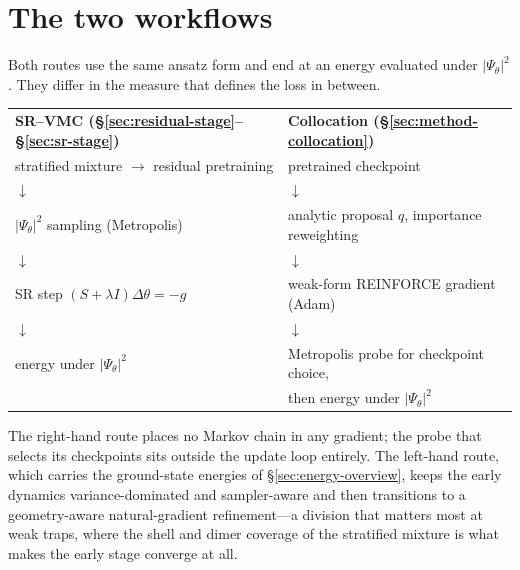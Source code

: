 \section{The two workflows}
\label{sec:opt-summary}

Both routes use the same ansatz form and end at an energy evaluated under
$|\Psi_\theta|^2$. They differ in the measure that defines the loss in between.
\begin{center}\small
\begin{tabular}{@{}ll@{}}
\textbf{SR--VMC (\S\ref{sec:residual-stage}--\S\ref{sec:sr-stage})} &
\textbf{Collocation (\S\ref{sec:method-collocation})}\\[2pt]
stratified mixture $\to$ residual pretraining &
pretrained checkpoint\\
$\downarrow$ & $\downarrow$\\
$|\Psi_\theta|^2$ sampling (Metropolis) &
analytic proposal $q$, importance reweighting\\
$\downarrow$ & $\downarrow$\\
SR step $(S+\lambda I)\Delta\theta=-g$ &
weak-form REINFORCE gradient (Adam)\\
$\downarrow$ & $\downarrow$\\
energy under $|\Psi_\theta|^2$ &
Metropolis probe for checkpoint choice,\\
 & then energy under $|\Psi_\theta|^2$\\
\end{tabular}
\end{center}
The right-hand route places no Markov chain in any gradient; the probe that selects its
checkpoints sits outside the update loop entirely. The left-hand route, which carries the
ground-state energies of \S\ref{sec:energy-overview}, keeps the early dynamics
variance-dominated and sampler-aware and then transitions to a geometry-aware
natural-gradient refinement---a division that matters most at weak traps, where the shell and
dimer coverage of the stratified mixture is what makes the early stage converge at all.

